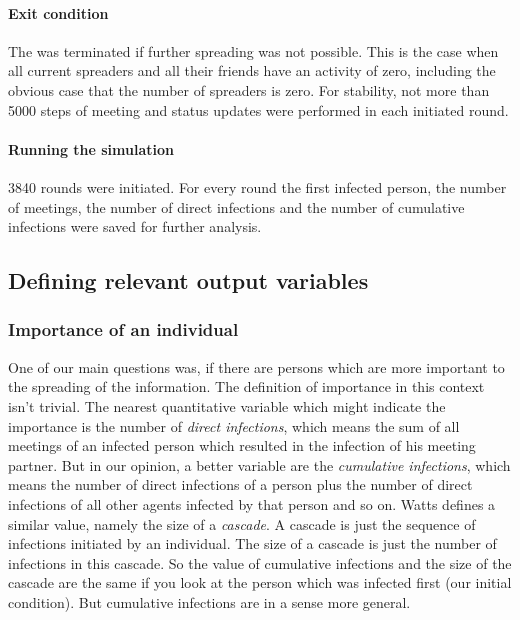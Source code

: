 \paragraph{Exit condition}

The  was terminated if further spreading was not possible. This is the case when all current spreaders and all their friends have an activity of zero, including the obvious case that the number of spreaders is zero. For stability, not more than 5000 steps of meeting and status updates were performed in each initiated round.

\paragraph{Running the simulation}
3840 rounds were initiated. For every round the first infected person, the number of meetings, the number of direct infections and the number of cumulative infections were saved for further analysis.

\subsection{Defining relevant output variables}

\subsubsection{Importance of an individual}

One of our main questions was, if there are persons which are more important to the spreading of the information. The definition of importance in this context isn't trivial. The nearest quantitative variable which might indicate the importance is the number of \textit{direct infections}, which means the sum of all meetings of an infected person which resulted in the infection of his meeting partner. But in our opinion, a better variable are the \textit{cumulative infections}, which means the number of direct infections of a person plus the number of direct infections of all other agents infected by that person and so on. Watts \cite{influentials} defines a similar value, namely the size of a \textit{cascade}. A cascade is just the sequence of infections initiated by an individual. The size of a cascade is just the number of infections in this cascade. So the value of cumulative infections and the size of the cascade are the same if you look at the person which was infected first (our initial condition). But cumulative infections are in a sense more general. 

